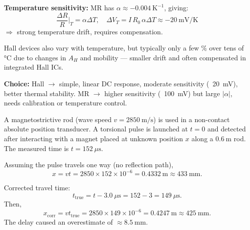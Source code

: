 

\begin{solutionblock}
\textbf{Temperature sensitivity:}  
MR has \(\alpha \approx -0.004~\text{K}^{-1}\), giving:
\[
\frac{\Delta R}{R}\bigg|_T = \alpha \Delta T,\quad \Delta V_T = I\,R_0\,\alpha \Delta T \approx -20~\text{mV/K}
\]
$\Rightarrow$ strong temperature drift, requires compensation.

Hall devices also vary with temperature, but typically only a few \% over tens of °C due to changes in \(A_H\) and mobility — smaller drift and often compensated in integrated Hall ICs.

\textbf{Choice:}  
Hall $\rightarrow$ simple, linear DC response, moderate sensitivity (~20~mV), better thermal stability.  
MR $\rightarrow$ higher sensitivity (~100~mV) but large \(|\alpha|\), needs calibration or temperature control.
\end{solutionblock}




A magnetostrictive rod (wave speed $v = 2850~\text{m/s}$) is used in a non-contact absolute position transducer. A torsional pulse is launched at $t = 0$ and detected after interacting with a magnet placed at unknown position $x$ along a $0.6~\text{m}$ rod. The measured time is $t = 152~\mu\text{s}$.



\begin{solutionblock}
Assuming the pulse travels one way (no reflection path),
\[
x = v t = 2850 \times 152 \times 10^{-6} 
   = 0.4332~\text{m} \approx 433~\text{mm.}
\]
\end{solutionblock}




\begin{solutionblock}
Corrected travel time:
\[
t_{\text{true}} = t - 3.0~\mu\text{s} = 152 - 3 = 149~\mu\text{s.}
\]
Then,
\[
x_{\text{corr}} = v t_{\text{true}} 
= 2850 \times 149 \times 10^{-6} 
= 0.4247~\text{m} \approx 425~\text{mm.}
\]
The delay caused an overestimate of $\approx 8.5~\text{mm.}$
\end{solutionblock}


